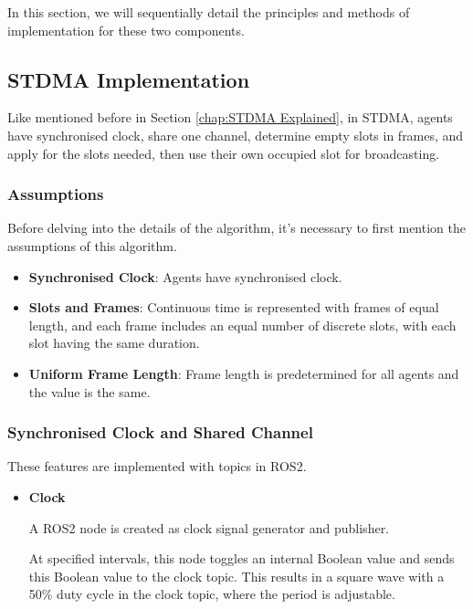 {In this section, we will sequentially detail the principles and methods of implementation for these two components.

\subsection{STDMA Implementation}
\label{chap:STDMA Implementation}

Like mentioned before in Section \ref{chap:STDMA Explained}, in STDMA, agents have synchronised clock, share one channel, determine empty slots in frames, and apply for the slots needed, then use their own occupied slot for broadcasting.

\subsubsection{Assumptions}


Before delving into the details of the algorithm, it's necessary to first mention the assumptions of this algorithm.

\begin{itemize}
    \item \textbf{Synchronised Clock}: Agents have synchronised clock.
    \item \textbf{Slots and Frames}: Continuous time is represented with frames of equal length, and each frame includes an equal number of discrete slots, with each slot having the same duration.
    \item \textbf{Uniform Frame Length}: Frame length is predetermined for all agents and the value is the same.
\end{itemize}


\subsubsection{Synchronised Clock and Shared Channel}

These features are implemented with topics in ROS2\footnotemark. 
\begin{itemize}
    \item \textbf{Clock}
    
    A ROS2 node is created as clock signal generator and publisher.

    At specified intervals, this node toggles an internal Boolean value and sends this Boolean value to the clock topic. This results in a square wave with a 50\% duty cycle in the clock topic, where the period is adjustable.


\end{itemize}}
